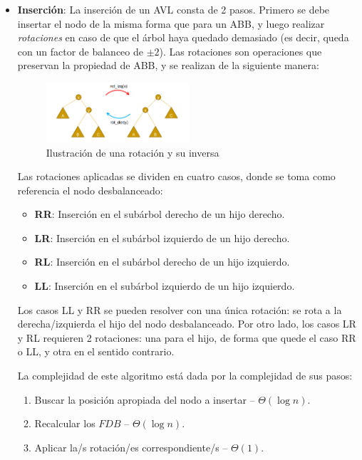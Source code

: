 \documentclass{article}
\newcommand{\BigTheta}[1]{{\Theta(#1)}}
\begin{document}
\begin{itemize}
    \item \textbf{Inserción}: La inserción de un AVL consta de 2 pasos. Primero se debe insertar el nodo de la misma forma que para un ABB, y luego realizar \textit{rotaciones} en caso de que el árbol haya quedado demasiado (es decir, queda con un factor de balanceo de $\pm 2$). Las rotaciones son operaciones que preservan la propiedad de ABB, y se realizan de la siguiente manera:
          \begin{figure}[H]
              \centering
              \includegraphics*[width=0.5\textwidth]{AVL_rotation.png}
              \caption*{Ilustración de una rotación y su inversa}
          \end{figure}

          Las rotaciones aplicadas se dividen en cuatro casos, donde se toma como referencia el nodo desbalanceado:
          \begin{itemize}
              \item \textbf{RR}: Inserción en el subárbol derecho de un hijo derecho.
              \item \textbf{LR}: Inserción en el subárbol izquierdo de un hijo derecho.
              \item \textbf{RL}: Inserción en el subárbol derecho de un hijo izquierdo.
              \item \textbf{LL}: Inserción en el subárbol izquierdo de un hijo izquierdo.
          \end{itemize}

          Los casos LL y RR se pueden resolver con una única rotación: se rota a la derecha/izquierda el hijo del nodo desbalanceado. Por otro lado, los casos LR y RL requieren 2 rotaciones: una para el hijo, de forma que quede el caso RR o LL, y otra en el sentido contrario.

          La complejidad de este algoritmo está dada por la complejidad de sus pasos:
          \begin{enumerate}
              \item Buscar la posición apropiada del nodo a insertar -- $\BigTheta{\log{n}}$.
              \item Recalcular los $FDB$ -- $\BigTheta{\log{n}}$.
              \item Aplicar la/s rotación/es correspondiente/s -- $\BigTheta{1}$.
          \end{enumerate}


\end{itemize}
\end{document}
